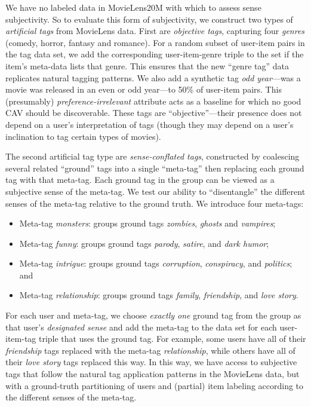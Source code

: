 \documentclass[manuscript,screen,nonacm]{acmart}
\newcommand{\1}{{\mathbf 1}}
\theoremstyle{TheoremNum}
\begin{document}
We have no labeled data in MovieLens20M with which to assess sense subjectivity. So to evaluate this form of
subjectivity, we construct two types of \emph{artificial tags} from MovieLens data.
First are \emph{objective tags}, capturing four \emph{genres} (comedy, horror, fantasy and romance). For a random subset of user-item pairs in the tag data set, we add the corresponding user-item-genre triple to the set if the item's meta-data lists that genre. This ensures that the new ``genre tag'' data replicates natural tagging patterns. We also add a synthetic tag \textit{odd year}---was a movie was released in an even or odd year---to 50\% of user-item pairs. This (presumably) \emph{preference-irrelevant} attribute acts as a baseline for which no good CAV should be discoverable. These tags are ``objective''---their presence does not depend on a user's interpretation of tags (though they may depend on a user's inclination to tag certain types of movies).

The second artificial tag type are \emph{sense-conflated tags}, constructed by coalescing several related ``ground'' tags into a single ``meta-tag'' then replacing each ground tag with that meta-tag. Each ground tag in the group can be viewed as a subjective sense of the meta-tag.
We test our ability to ``disentangle'' the different senses of the meta-tag relative to the ground truth. We introduce four meta-tags:
\begin{itemize}
    \item Meta-tag \textit{monsters}: groups ground tags \textit{zombies}, \textit{ghosts} and \textit{vampires};
    \item Meta-tag \textit{funny}: groups ground tags \textit{parody}, \textit{satire}, and \textit{dark humor};
    \item Meta-tag \textit{intrigue}: groups ground tags \textit{corruption}, \textit{conspiracy}, and \textit{politics}; and
    \item Meta-tag \textit{relationship}: groups ground tags \textit{family}, \textit{friendship}, and \textit{love story}. 
\end{itemize}
For each user and meta-tag, we choose \emph{exactly one} ground tag from the group as that user's \emph{designated sense} and add the meta-tag to the data set for each user-item-tag triple that uses the ground tag. For example, some users have all of their \textit{friendship} tags replaced with the meta-tag \textit{relationship}, while others have all of their \textit{love story} tags replaced this way.
In this way, we have access to subjective tags that follow the natural tag application patterns in the MovieLens data, but with a ground-truth partitioning of users and (partial) item labeling according to the different senses of the meta-tag.
\end{document}
